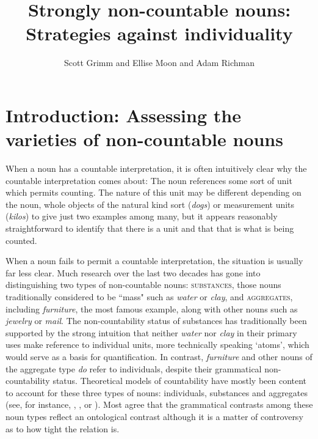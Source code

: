 \documentclass[output=paper]{langscibook}
\author{Scott Grimm\affiliation{University of Rochester} and Ellise Moon\affiliation{University of Rochester} and Adam Richman\affiliation{University of Rochester}}
\title{Strongly non-countable nouns: Strategies against individuality}
\begin{document}
\maketitle


\section{Introduction: Assessing the varieties of non-countable nouns}
When a noun has a countable interpretation, it is often intuitively clear why the countable interpretation comes about: The noun references some sort of unit which permits counting. The nature of this unit may be different depending on the noun, whole objects of the natural kind sort (\textit{dogs}) or measurement units (\textit{kilos}) to give just two examples among many, but it appears reasonably straightforward to identify that there is a unit and that that is what is being counted.

 When a noun fails to permit a countable interpretation, the situation is usually far less clear. Much research over the last two decades has gone into distinguishing two types of non-countable nouns: \textsc{substances}, those nouns traditionally considered to be ``mass" such as \textit{water} or \textit{clay}, and \textsc{aggregates}, including \textit{furniture}, the most famous example, along with other nouns such as \textit{jewelry} or \textit{mail}. The non-countability status of substances has traditionally been supported by the strong intuition that neither \textit{water} nor \textit{clay} in their primary uses make reference to individual units, more technically speaking `atoms', which would serve as a basis for quantification. %
 In contrast, \textit{furniture} and other nouns of the aggregate type \textit{do} refer to individuals, despite their grammatical non-countability status.  Theoretical models of countability have mostly been content to account for these three types of nouns: individuals, substances and aggregates (see, for instance, \citealt{Bale2009}, \citealt{Chierchia2010}, or \citealt{Deal2016}).  Most agree that the grammatical contrasts among these noun types reflect an ontological contrast although it is a matter of controversy as to how tight the relation is.  
\end{document}
